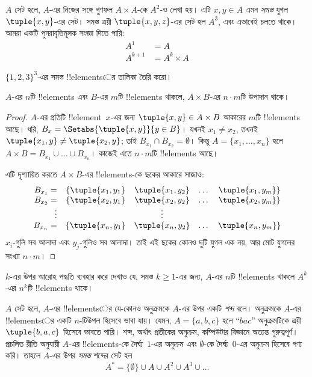 \documentclass[../../../include/open-logic-section]{subfiles}
\begin{document}
\begin{ex}
$A$ সেট হলে, $A$-এর নিজের সঙ্গে গুণফল $A \times A$-কে $A^2$-ও
লেখা হয়। এটি $x, y \in A$ এমন \emph{সমস্ত} যুগল $\tuple{x, y}$-এর
সেট। সমস্ত ত্রয়ী $\tuple{x, y, z}$-এর সেট হল $A^3$, এবং এভাবেই
চলতে থাকে। আমরা একটি পুনরাবৃত্তিমূলক সংজ্ঞা দিতে পারি:
\begin{align*}
  A^1 & = A\\
  A^{k+1} & = A^k \times A
\end{align*}
\end{ex}

\begin{prob}
$\{1, 2, 3\}^3$-এর সমস্ত !!{element}sের তালিকা তৈরি করো।
\end{prob}

\begin{prop}
$A$-এর $n$টি !!{element}s এবং $B$-এর $m$টি !!{element}s থাকলে,
$A \times B$-এর $n\cdot m$টি উপাদান থাকে।
\end{prop}

\begin{proof}
$A$-এর প্রতিটি !!{element}~$x$-এর জন্য $\tuple{x, y} \in A \times B$
আকারের $m$টি !!{element}s আছে। ধরি,
$B_x = \Setabs{\tuple{x, y}}{y \in B}$। যখনই $x_1 \neq x_2$,
তখনই $\tuple{x_1, y} \neq \tuple{x_2, y}$;
তাই $B_{x_1} \cap B_{x_2} = \emptyset$। কিন্তু $A = \{x_1, \dots, x_n\}$
হলে $A \times B = B_{x_1} \cup \dots \cup B_{x_n}$।
কাজেই এতে $n\cdot m$টি !!{element}s আছে।

এটি দৃশ্যায়িত করতে $A \times B$-এর !!{element}s-কে ছকের আকারে সাজাও:
\[
\begin{array}{rcccc}
  B_{x_1} = & \{\tuple{x_1, y_1} & \tuple{x_1, y_2} & \dots & \tuple{x_1, y_m}\}\\
  B_{x_2} = & \{\tuple{x_2, y_1} & \tuple{x_2, y_2} & \dots & \tuple{x_2, y_m}\}\\
  \vdots & & \vdots\\
  B_{x_n} = & \{\tuple{x_n, y_1} & \tuple{x_n, y_2} & \dots & \tuple{x_n, y_m}\}
\end{array}
\]
$x_i$-গুলি সব আলাদা এবং $y_j$-গুলিও সব আলাদা। তাই এই ছকের
কোনও দুটি যুগল এক নয়, আর মোট যুগলের সংখ্যা $n\cdot m$।
\end{proof}

\begin{prob}
$k$-এর উপর আরোহ পদ্ধতি ব্যবহার করে দেখাও যে, সমস্ত $k \ge 1$-এর জন্য,
$A$-এর $n$টি !!{element}s থাকলে $A^k$-এর $n^k$টি !!{element}s থাকে।
\end{prob}

\begin{ex}
$A$ সেট হলে, $A$-এর !!{element}sের যে-কোনও অনুক্রমকে $A$-এর উপর
একটি \emph{শব্দ} বলে। অনুক্রমকে $A$-এর !!{element}sের একটি
$n$-টিউপল হিসেবে ভাবা যায়। যেমন, $A = \{a, b, c\}$ হলে ``$bac$''
অনুক্রমটিকে ত্রয়ী~$\tuple{b, a, c}$ হিসেবে ভাবতে পারি। শব্দ, অর্থাৎ
প্রতীকের অনুক্রম, কম্পিউটার বিজ্ঞানে অত্যন্ত গুরুত্বপূর্ণ। প্রচলিত রীতি
অনুযায়ী $A$-এর !!{element}s-কে দৈর্ঘ্য~$1$-এর অনুক্রম এবং
$\emptyset$-কে দৈর্ঘ্য~$0$-এর অনুক্রম হিসেবে গণ্য করি।
তাহলে $A$-এর উপর \emph{সমস্ত} শব্দের সেট হল
\[
A^* = \{\emptyset\} \cup A \cup A^2 \cup A^3 \cup \dots
\]
\end{ex}
\end{document}
